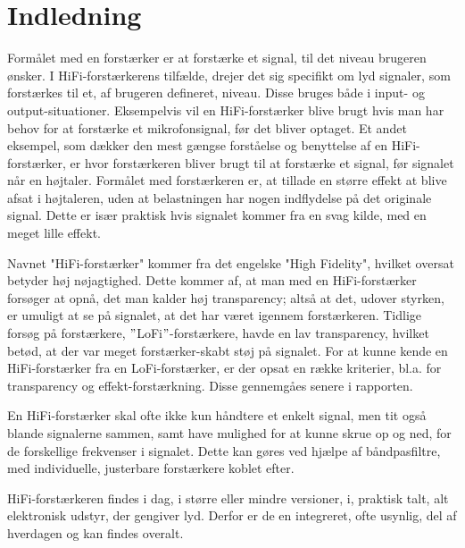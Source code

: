 \chapter{Indledning}
\label{indledning}
Formålet med en forstærker er at forstærke et signal, til det niveau brugeren ønsker. I HiFi-forstærkerens tilfælde, drejer det sig specifikt om lyd signaler, som forstærkes til et, af brugeren defineret, niveau. Disse bruges både i input- og output-situationer. Eksempelvis vil en HiFi-forstærker blive brugt hvis man har behov for at forstærke et mikrofonsignal, før det bliver optaget. Et andet eksempel, som dækker den mest gængse forståelse og benyttelse af en HiFi-forstærker, er hvor forstærkeren bliver brugt til at forstærke et signal, før signalet når en højtaler. Formålet med forstærkeren er, at tillade en større effekt at blive afsat i højtaleren, uden at belastningen har nogen indflydelse på det originale signal. Dette er især praktisk hvis signalet kommer fra en svag kilde, med en meget lille effekt.

Navnet "HiFi-forstærker" kommer fra det engelske "High Fidelity", hvilket oversat betyder høj nøjagtighed. Dette kommer af, at man med en HiFi-forstærker forsøger at opnå, det man kalder høj transparency; altså at det, udover styrken, er umuligt at se på signalet, at det har været igennem forstærkeren. Tidlige forsøg på forstærkere, $"$LoFi$"$-forstærkere, havde en lav transparency, hvilket betød, at der var meget forstærker-skabt støj på signalet. For at kunne kende en HiFi-forstærker fra en LoFi-forstærker, er der opsat en række kriterier, bl.a. for transparency og effekt-forstærkning. Disse gennemgåes senere i rapporten.

En HiFi-forstærker skal ofte ikke kun håndtere et enkelt signal, men tit også blande signalerne sammen, samt have mulighed for at kunne skrue op og ned, for de forskellige frekvenser i signalet. Dette kan gøres ved hjælpe af båndpasfiltre, med individuelle, justerbare forstærkere koblet efter.

HiFi-forstærkeren findes i dag, i større eller mindre versioner, i, praktisk talt, alt elektronisk udstyr, der gengiver lyd. Derfor er de en integreret, ofte usynlig, del af hverdagen og kan findes overalt.